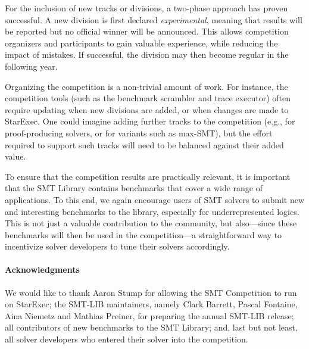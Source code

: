\documentclass[dvipsnames,table,twoside,11pt]{article}
\begin{document}
For the inclusion of new tracks or divisions, a two-phase approach has
proven successful.  A new division is first declared
\emph{experimental}, meaning that results will be reported but no
official winner will be announced.  This allows competition organizers
and participants to gain valuable experience, while reducing the
impact of mistakes.  If successful, the division may then become
regular in the following year.

Organizing the competition is a non-trivial amount of work.  For
instance, the competition tools (such as the benchmark scrambler and
trace executor) often require updating when new divisions are added,
or when changes are made to StarExec.  One could imagine adding
further tracks to the competition (e.g., for proof-producing solvers,
or for variants such as max-SMT), but the effort required to support
such tracks will need to be balanced against their added value.

To ensure that the competition results are practically relevant, it is
important that the SMT Library contains benchmarks that cover a wide
range of applications.  To this end, we again encourage users of SMT
solvers to submit new and interesting benchmarks to the library,
especially for underrepresented logics.  This is not just a valuable
contribution to the community, but also---since these benchmarks will
then be used in the competition---a straightforward way to incentivize
solver developers to tune their solvers accordingly.

\paragraph{Acknowledgments}

We would like to thank Aaron Stump for allowing the SMT Competition to
run on StarExec; the SMT-LIB maintainers, namely Clark Barrett, Pascal
Fontaine, Aina Niemetz and Mathias Preiner, for preparing the annual
SMT-LIB release; all contributors of new benchmarks to the SMT
Library; and, last but not least, all solver developers who entered
their solver into the competition.




\end{document}

